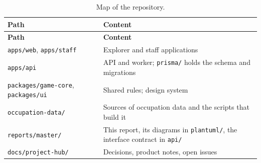 {\small
\begin{longtable}{|>{\raggedright\arraybackslash}p{}|>{\raggedright\arraybackslash}p{}|}
\caption{Map of the repository.} \\
\hline
\textbf{Path} & \textbf{Content} \\ \hline
\endfirsthead
\hline
\textbf{Path} & \textbf{Content} \\ \hline
\endhead
\texttt{apps/web}, \texttt{apps/staff} & Explorer and staff applications \\ \hline
\texttt{apps/api} & API and worker; \texttt{prisma/} holds the schema and migrations \\ \hline
\texttt{packages/game-core}, \texttt{packages/ui} & Shared rules; design system \\ \hline
\texttt{occupation-data/} & Sources of occupation data and the scripts that build it \\ \hline
\texttt{reports/master/} & This report, its diagrams in \texttt{plantuml/}, the interface contract in \texttt{api/} \\ \hline
\texttt{docs/project-hub/} & Decisions, product notes, open issues \\ \hline
\end{longtable}
}
